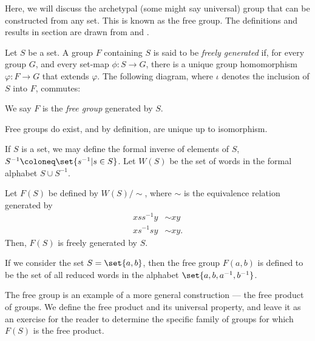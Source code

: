 \documentclass[10pt]{mypackage2}
\begin{document}
Here, we will discuss the archetypal (some might say universal) group that can be constructed from any set. This is known as the free group. The definitions and results in section are drawn from \cite{delaHarpe_topics_in_geometric_group_theory} and \cite{loh_geometric_group_theory}.
\begin{definition}\label{def:free_group}
  Let $S$ be a set. A group $F$ containing $S$ is said to be \textit{freely generated} if, for every group $G$, and every set-map $\phi\colon S\rightarrow G$, there is a unique group homomorphism $\varphi\colon F\rightarrow G$ that extends $\varphi$. The following diagram, where $\iota$ denotes the inclusion of $S$ into $F$, commutes:
  \begin{center}
  \end{center}
We say $F$ is the \textit{free group} generated by $S$.
\end{definition}
Free groups do exist, and by definition, are unique up to isomorphism.
\begin{theorem}
  If $S$ is a set, we may define the formal inverse of elements of $S$, $S^{-1} \coloneq \set{s^{-1} | s\in S}$. Let $W(S)$ be the set of words in the formal alphabet $S\cup S^{-1}$.\newline

  Let $F(S)$ be defined by $W(S)/\sim$, where $\sim$ is the equivalence relation generated by
  \begin{align*}
    xss^{-1}y &\sim xy\\
    xs^{-1}sy &\sim xy.
  \end{align*}
  Then, $F(S)$ is freely generated by $S$.
\end{theorem}
\begin{example}
  If we consider the set $S = \set{a,b}$, then the free group $F(a,b)$ is defined to be the set of all reduced words in the alphabet $\set{a,b,a^{-1},b^{-1}}$.
\end{example}
The free group is an example of a more general construction --- the free product of groups. We define the free product and its universal property, and leave it as an exercise for the reader to determine the specific family of groups for which $F(S)$ is the free product.
\end{document}
